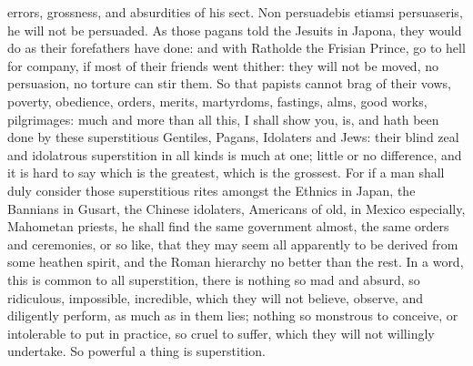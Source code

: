 {errors, grossness, and absurdities of his sect. Non persuadebis etiamsi
persuaseris, he will not be persuaded. As those pagans told the Jesuits
in Japona, they would do as their forefathers have done: and with
Ratholde the Frisian Prince, go to hell for company, if most of their
friends went thither: they will not be moved, no persuasion, no torture
can stir them. So that papists cannot brag of their vows, poverty,
obedience, orders, merits, martyrdoms, fastings, alms, good works,
pilgrimages: much and more than all this, I shall show you, is, and
hath been done by these superstitious Gentiles, Pagans, Idolaters and
Jews: their blind zeal and idolatrous superstition in all kinds is much
at one; little or no difference, and it is hard to say which is the
greatest, which is the grossest. For if a man shall duly consider those
superstitious rites amongst the Ethnics in Japan, the Bannians in
Gusart, the Chinese idolaters, Americans of old, in Mexico
especially, Mahometan priests, he shall find the same government
almost, the same orders and ceremonies, or so like, that they may seem
all apparently to be derived from some heathen spirit, and the Roman
hierarchy no better than the rest. In a word, this is common to all
superstition, there is nothing so mad and absurd, so ridiculous,
impossible, incredible, which they will not believe, observe, and
diligently perform, as much as in them lies; nothing so monstrous to
conceive, or intolerable to put in practice, so cruel to suffer, which
they will not willingly undertake. So powerful a thing is superstition.

}
